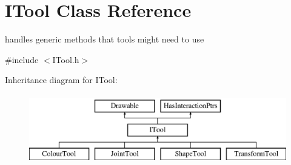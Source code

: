 \hypertarget{class_i_tool}{}\section{I\+Tool Class Reference}
\label{class_i_tool}


handles generic methods that tools might need to use  




{\ttfamily \#include $<$I\+Tool.\+h$>$}

Inheritance diagram for I\+Tool\+:\begin{figure}[H]
\begin{center}
\leavevmode
\includegraphics[height=3.000000cm]{class_i_tool}
\end{center}
\end{figure}

